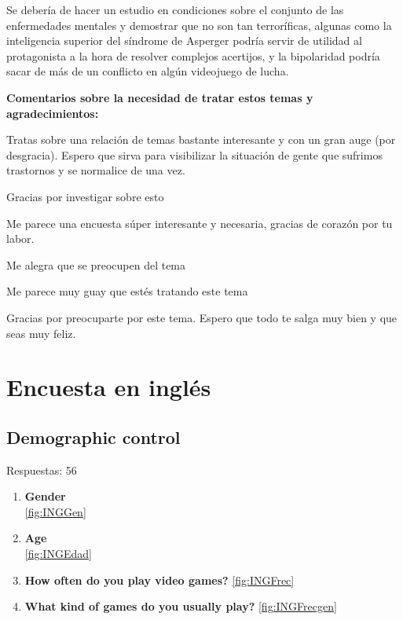 \documentclass[12pt, a4paper,twoside,titlepage]{book}
\begin{document}
\begin{enumerate}[label=\textbf{\arabic*}.]
    Se debería de hacer un estudio en condiciones sobre el conjunto de las enfermedades mentales y demostrar que no son tan terroríficas, algunas como la inteligencia superior del síndrome de Asperger podría servir de utilidad al protagonista a la hora de resolver complejos acertijos, y la bipolaridad podría sacar de más de un conflicto en algún videojuego de lucha.

    \textbf{Comentarios sobre la necesidad de tratar estos temas y agradecimientos:}
    
    Tratas sobre una relación de temas bastante interesante y con un gran auge (por desgracia). Espero que sirva para visibilizar la situación de gente que sufrimos trastornos y se normalice de una vez.
    
    Gracias por investigar sobre esto 
    
    Me parece una encuesta súper interesante y necesaria, gracias de corazón por tu labor. 
    
    Me alegra que se preocupen del tema
    
    Me parece muy guay que estés tratando este tema
    
    Gracias por preocuparte por este tema. Espero que todo te salga muy bien y que seas muy feliz. 

    
\end{enumerate}




\newpage

\section{Encuesta en inglés}

\subsection{Demographic control}
Respuestas: 56
\begin{enumerate}[label=\textbf{\arabic*}.]
     \item \textbf{Gender}\\
     \ref{fig:INGGen}
     \item \textbf{Age}\\
     \ref{fig:INGEdad}
     \item \textbf{How often do you play video games?}
     \ref{fig:INGFrec}
     \item \textbf{What kind of games do you usually play?}
     \ref{fig:INGFrecgen}
\end{enumerate}
\end{document}
